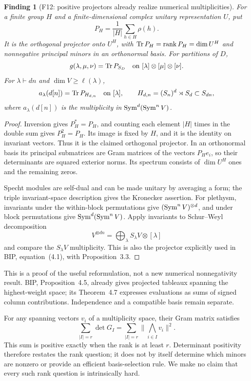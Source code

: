 \documentclass[11pt,a4paper]{article}
\newcommand{\fid}[1]{\textsf{#1}}\newcommand{\gate}[1]{\textsf{#1}}
\theoremstyle{named}\newtheorem{finding}{Finding}[section]
\theoremstyle{definition}\newtheorem{definition}[finding]{Definition}
\theoremstyle{remark}\newtheorem{remark}[finding]{Remark}
\begin{document}
\begin{finding}[\fid{F12}: positive projectors already realize numerical multiplicities]\label{f:projector}
For a finite group $H$ and a finite-dimensional complex unitary representation $U$, put
\[
 P_H=\frac1{|H|}\sum_{h\in H}\rho(h).
\]
It is the orthogonal projector onto $U^H$, with $\operatorname{Tr} P_H=\operatorname{rank} P_H=\dim U^H$ and nonnegative principal minors in an orthonormal basis. For partitions of $D$,
\[
 g(\lambda,\mu,\nu)=\operatorname{Tr} P_{S_D}
 \quad\text{on }[\lambda]\otimes[\mu]\otimes[\nu].
\]
For $\lambda\vdash dn$ and $\dim V\ge\ell(\lambda)$,
\[
 a_\lambda(d[n])=\operatorname{Tr} P_{H_{d,n}}\quad\text{on }[\lambda],\qquad
 H_{d,n}=(S_n)^d\rtimes S_d\subset S_{dn},
\]
where $a_\lambda(d[n])$ is the multiplicity in $\operatorname{Sym}^d(\operatorname{Sym}^nV)$.
\end{finding}
\begin{proof}
Inversion gives $P_H^*=P_H$, and counting each element $|H|$ times in the double sum gives $P_H^2=P_H$. Its image is fixed by $H$, and it is the identity on invariant vectors. Thus it is the claimed orthogonal projector. In an orthonormal basis its principal submatrices are Gram matrices of the vectors $P_He_i$, so their determinants are squared exterior norms. Its spectrum consists of $\dim U^H$ ones and the remaining zeros.

Specht modules are self-dual and can be made unitary by averaging a form; the triple invariant-space description gives the Kronecker assertion. For plethysm, invariants under the within-block permutations give $(\operatorname{Sym}^n V)^{\otimes d}$, and under block permutations give $\operatorname{Sym}^d(\operatorname{Sym}^nV)$. Apply invariants to Schur--Weyl decomposition
\[
 V^{\otimes dn}=\bigoplus_\lambda S_\lambda V\otimes[\lambda]
\]
and compare the $S_\lambda V$ multiplicity. This is also the projector explicitly used in BIP, equation~(4.1), with Proposition~3.3.
\end{proof}
This is a proof of the useful reformulation, not a new numerical nonnegativity result. BIP, Proposition~4.5, already gives projected tableaux spanning the highest-weight space; its Theorem~4.7 expresses evaluations as sums of signed column contributions. Independence and a compatible basis remain separate.

For any spanning vectors $v_i$ of a multiplicity space, their Gram matrix satisfies
\[
 \sum_{|I|=r}\det G_I=\sum_{|I|=r}\bigl\|\bigwedge_{i\in I}v_i\bigr\|^2.
\]
This sum is positive exactly when the rank is at least $r$. Determinant positivity therefore restates the rank question; it does not by itself determine which minors are nonzero or provide an efficient basis-selection rule. We make no claim that every such rank question is intrinsically hard.
\end{document}
